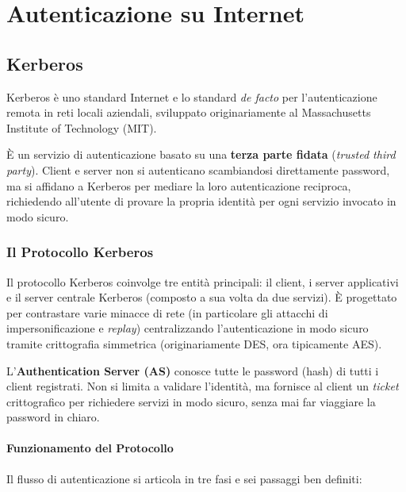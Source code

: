 \chapter{Autenticazione su Internet}

\section{Kerberos}

Kerberos è uno standard Internet e lo standard \textit{de facto} per l'autenticazione remota in reti locali aziendali, sviluppato originariamente al Massachusetts Institute of Technology (MIT). 

\begin{notebox}
È un servizio di autenticazione basato su una \textbf{terza parte fidata} (\textit{trusted third party}). Client e server non si autenticano scambiandosi direttamente password, ma si affidano a Kerberos per mediare la loro autenticazione reciproca, richiedendo all'utente di provare la propria identità per ogni servizio invocato in modo sicuro.
\end{notebox}

\subsection{Il Protocollo Kerberos}

Il protocollo Kerberos coinvolge tre entità principali: il client, i server applicativi e il server centrale Kerberos (composto a sua volta da due servizi). È progettato per contrastare varie minacce di rete (in particolare gli attacchi di impersonificazione e \textit{replay}) centralizzando l'autenticazione in modo sicuro tramite crittografia simmetrica (originariamente DES, ora tipicamente AES).

L'\textbf{Authentication Server (AS)} conosce tutte le password (hash) di tutti i client registrati. Non si limita a validare l'identità, ma fornisce al client un \textit{ticket} crittografico per richiedere servizi in modo sicuro, senza mai far viaggiare la password in chiaro.

\subsubsection{Funzionamento del Protocollo}
Il flusso di autenticazione si articola in tre fasi e sei passaggi ben definiti:

